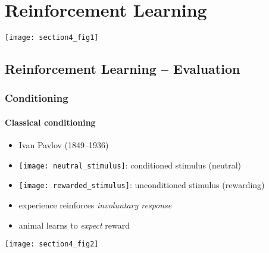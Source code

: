 \newpage
{}

\section{Reinforcement Learning}
	\begin{center}
		\texttt{[image: section4\_fig1]}
	\end{center}
\subsection{Reinforcement Learning -- Evaluation}
\subsubsection{Conditioning}
\paragraph{Classical conditioning}
	\begin{itemize}
				\item Ivan Pavlov (1849--1936)
				\vspace{2mm}
				\item \texttt{[image: neutral\_stimulus]}:
					conditioned stimulus (neutral)
				\vspace{2mm}
				\item \texttt{[image: rewarded\_stimulus]}:
					unconditioned stimulus (rewarding)
				\vspace{2mm}
				\item experience reinforces {\em involuntary response}
				\vspace{2mm}
				\item animal learns to {\em expect} reward
			\end{itemize} 
\begin{center}
		\texttt{[image: section4\_fig2]}
\end{center}
